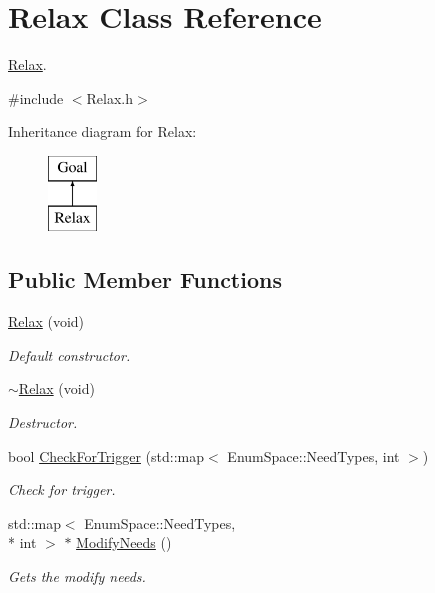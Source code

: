 \hypertarget{class_relax}{\section{Relax Class Reference}
\label{class_relax}
}


\hyperlink{class_relax}{Relax}.  




{\ttfamily \#include $<$Relax.\-h$>$}

Inheritance diagram for Relax\-:\begin{figure}[H]
\begin{center}
\leavevmode
\includegraphics[height=2.000000cm]{class_relax}
\end{center}
\end{figure}
\subsection*{Public Member Functions}
\begin{DoxyCompactItemize}
\item 
\hyperlink{class_relax_a0f1d94211260f96ea86af71412ab36d9}{Relax} (void)
\begin{DoxyCompactList}\small\item\em Default constructor. \end{DoxyCompactList}\item 
\hyperlink{class_relax_a77234cd44af336562af9823f5a3331b6}{$\sim$\-Relax} (void)
\begin{DoxyCompactList}\small\item\em Destructor. \end{DoxyCompactList}\item 
bool \hyperlink{class_relax_acb68b24772650ec9c944e70161f5795f}{Check\-For\-Trigger} (std\-::map$<$ Enum\-Space\-::\-Need\-Types, int $>$)
\begin{DoxyCompactList}\small\item\em Check for trigger. \end{DoxyCompactList}\item 
std\-::map$<$ Enum\-Space\-::\-Need\-Types, \\*
int $>$ $\ast$ \hyperlink{class_relax_a13ab3bd20dc62c0511a657879827feae}{Modify\-Needs} ()
\begin{DoxyCompactList}\small\item\em Gets the modify needs. \end{DoxyCompactList}\end{DoxyCompactItemize}


